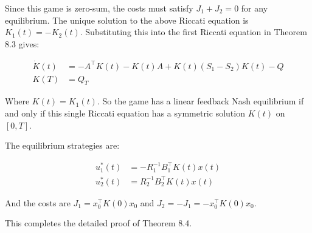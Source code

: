 \documentclass[3p]{elsarticle}
\begin{document}
Since this game is zero-sum, the costs must satisfy $J_1 + J_2 = 0$ for any equilibrium. The unique solution to the above Riccati equation is $K_1(t) = -K_2(t)$. Substituting this into the first Riccati equation in Theorem 8.3 gives:

\begin{align*} 
\dot{K}(t) &= -A^\top K(t) - K(t)A + K(t)(S_1-S_2)K(t) - Q \\
K(T) &= Q_T
\end{align*}

Where $K(t) = K_1(t)$. So the game has a linear feedback Nash equilibrium if and only if this single Riccati equation has a symmetric solution $K(t)$ on $[0,T]$. 

The equilibrium strategies are:

\begin{align*}
u_1^*(t) &= -R_1^{-1}B_1^\top K(t) x(t) \\ 
u_2^*(t) &= R_2^{-1}B_2^\top K(t) x(t)
\end{align*}

And the costs are $J_1 = x_0^\top K(0) x_0$ and $J_2 = -J_1 = -x_0^\top K(0) x_0$.

This completes the detailed proof of Theorem 8.4.




\end{document}
